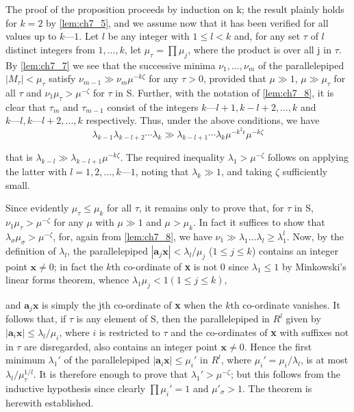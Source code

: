 The proof of the proposition proceeds by induction on k; 
the result plainly holds for $k = 2$ by \autoref{lem:ch7_5}, 
and we assume now that it has been verified for all values up to $k — 1$. 
Let $l$ be any integer with $1 \le l < k$ and, 
for any set $\tau$ of $l$ distinct integers from $1, \dots, k$, 
let $\mu_\tau = \prod \mu_j$, where the product is over all j in $\tau$. 
By \autoref{lem:ch7_7} we see that the successive minima $\nu_1, \dots, \nu_m$ of the 
parallelepiped $|M_\tau| < \mu_\tau$ satisfy $\nu_{m-1} \gg \nu_m \mu^{-k\zeta}$ for any $\tau>0$, 
provided that $\mu \gg 1$, $\mu \gg \mu_\tau$ for all $\tau$ 
and $\nu_1 \mu_\tau > \mu^{-\zeta}$ for $\tau$ in S. 
Further, with the notation of \autoref{lem:ch7_8}, 
it is clear that $\tau_{m}$ and $\tau_{m-1}$ consist of the integers $k — l+1, k - l + 2, ..., k$ and $k — l, k — l + 2, ..., k$ respectively. 
Thus, under the above conditions, 
we have 
\[
    \lambda_{k-1}\lambda_{k-l+2}\cdots\lambda_k \gg \lambda_{k-l+1}\cdots\lambda_k \mu^{-k^2\epsilon}\mu^{-k\zeta} 
\] 

that is $\lambda_{k-l} \gg \lambda_{k-l+1} \mu^{-k\zeta}$. 
The required inequality $\lambda_1 > \mu^{-\zeta}$ follows on applying the latter with $l = 1, 2, ..., k — 1$, 
noting that $\lambda_k \gg 1$, and taking $\zeta$ sufficiently small.

Since evidently $\mu_\tau \le \mu_k$ for all $\tau$, 
it remains only to prove that, for $\tau$ in S, 
$\nu_1 \mu_\tau > \mu^{-\zeta}$ for any $\mu$ with $\mu \gg 1$ 
and $\mu > \mu_k$. In fact it suffices to show that $\lambda_\sigma \mu_\sigma > \mu^{-\zeta}$, 
for, again from \autoref{lem:ch7_8}, we have $\nu_1 \gg \lambda_1 \dots \lambda_l \geqslant \lambda_1^{l}$. 
Now, by the definition of $\lambda_l$, 
the parallelepiped $|\mathbf{a}_j \mathbf{x}| < \lambda_l/\mu_j$ ($1 \leqslant j \leqslant k$) contains an 
integer point $\mathbf{x} \neq 0$; 
in fact the $k$th co-ordinate of \textbf{x} is not 0 since $\lambda_1 \leqslant 1$ 
by Minkowski's linear forms theorem, 
whence 
$\lambda_1\mu_j <  1(1\leqslant j \leqslant k)$, 

and $\mathbf{a}_j \mathbf{x}$ is simply the jth co-ordinate of \textbf{x} when the $k$th co-ordinate vanishes. 
It follows that, if $\tau$ is any element of S, 
then the parallelepiped in $R^l$ given by $|\mathbf{a}_i \mathbf{x}| \leqslant \lambda_l/\mu_i$, 
where $i$ is restricted to $\tau$ and the co-ordinates of \textbf{x} with suffixes not in $\tau$ 
are disregarded, also contains an integer point $\mathbf{x} \neq 0$. 
Hence the first minimum $\lambda_1'$ of the parallelepiped $|\mathbf{a}_i \mathbf{x}| \le \mu_i'$ in $R^l$, 
where $\mu_i' = \mu_i/\lambda_l$, 
is at most $\lambda_l/\mu_\tau^{1/l}$. 
It is therefore enough to prove that $\lambda_1' > \mu^{-\zeta}$; 
but this follows from the inductive hypothesis since clearly $\prod \mu_i' = 1$ and $\mu'_\sigma > 1$. 
The theorem is herewith established.
